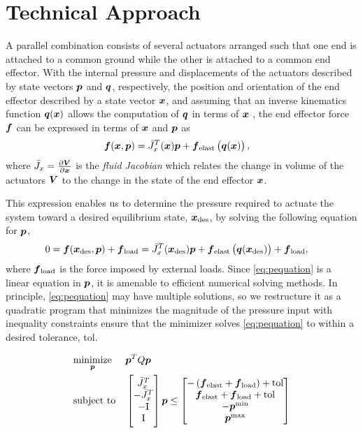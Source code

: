 \section{Technical Approach}    \label{sec:technical-approach}

A parallel combination consists of several actuators arranged such that one end is attached to a common ground while the other is attached to a common end effector. With the internal pressure and displacements of the actuators described by state vectors $\p$ and $\q$, respectively, the position and orientation of the end effector described by a state vector $\x$, and assuming that an inverse kinematics function $\q(\x)$ allows the computation of  $\q$ in terms of $\x$ , the end effector force $\f$ can be expressed in terms of $\x$ and $\p$ as 
\begin{align}
    \f (\x, \p) &= \J_x^T (\x) \p + \f_{\tx{elast}} \left( \q(\x) \right),
\end{align}
where $\J_x = \frac{\partial \vec{V}}{\partial \x}$ is the \emph{fluid Jacobian} which relates the change in volume of the actuators $\V$ to the change in the state of the end effector $\x$.

This expression enables us to determine the pressure required to actuate the system toward a desired equilibrium state, $\x_\tx{des}$, by solving the following equation for $\p$,
\begin{align}
    0 &= \f (\x_{\tx{des}}, \p) + \f_\tx{load} =  \J_x^T (\x_\tx{des}) \p + \f_{\tx{elast}} \left( \q(\x_\tx{des}) \right) + \f_\tx{load} , 
    \label{eq:pequation}
\end{align}
where $\f_\tx{load}$ is the force imposed by external loads.
Since \eqref{eq:pequation} is a linear equation in $\p$, it is amenable to efficient numerical solving methods. In principle, \eqref{eq:pequation} may have multiple solutions, so we restructure it as a quadratic program that minimizes the magnitude of the pressure input with inequality constraints ensure that the minimizer solves \eqref{eq:pequation} to within a desired tolerance, tol.

\begin{equation}
\begin{aligned}
    & \underset{\p}{\text{minimize}}
    & & \p^T Q \p \\
    & \text{subject to}
    & & \mtx{\J_x^T \\ 
            -\J_x^T \\
            -\text{I} \\ \text{I}} \p
        \leq 
        \mtx{- \left( \f_{\tx{elast}} + \f_\tx{load} \right) + \text{tol} \\
            \f_{\tx{elast}} + \f_\tx{load} + \text{tol} \\
            -\p^\text{min} \\ \p^\text{max}}
\end{aligned}
\end{equation}

